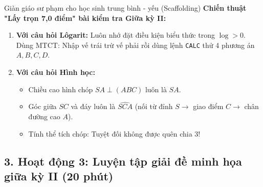 \documentclass[12pt, a4paper]{article}
\begin{document}
\begin{scaffoldbox}{Giàn giáo sư phạm cho học sinh trung bình - yếu (Scaffolding)}
    \textbf{Chiến thuật "Lấy trọn 7,0 điểm" bài kiểm tra Giữa kỳ II:}
    \begin{enumerate}[leftmargin=0.6cm]
        \item \textbf{Với câu hỏi Lôgarit:} Luôn nhớ đặt điều kiện biểu thức trong $\log > 0$. Dùng MTCT: Nhập vế trái trừ vế phải rồi dùng lệnh \texttt{CALC} thử 4 phương án $A, B, C, D$.
        \item \textbf{Với câu hỏi Hình học:}
        \begin{itemize}
            \item Chiều cao hình chóp $SA \perp (ABC)$ luôn là $SA$.
            \item Góc giữa $SC$ và đáy luôn là $\widehat{SCA}$ (nối từ đỉnh $S \to$ giao điểm $C \to$ chân đường cao $A$).
            \item Tính thể tích chóp: Tuyệt đối không được quên chia $3$!
        \end{itemize}
    \end{enumerate}
\end{scaffoldbox}

\subsection*{3. Hoạt động 3: Luyện tập giải đề minh họa giữa kỳ II (20 phút)}
\end{document}
